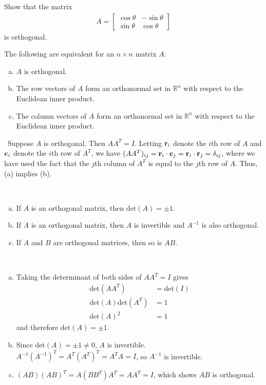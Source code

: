 \documentclass[12pt,letterpaper,reqno]{article}
\numberwithin{equation}{section}
\newcommand{\fixme}[1]{{\color{orange}{[#1]}}}
\begin{document}
\begin{exercise}
	Show that the matrix
	\begin{align*}
		A=\begin{bmatrix}
			\cos \theta & -\sin \theta \\
			\sin \theta & \cos \theta
		\end{bmatrix}
	\end{align*}
	is orthogonal.
\end{exercise}

\begin{thm}
	The following are equivalent for an $n \times n$ matrix $A$.
	\begin{enumerate}[(a)]
		\item $A$ is orthogonal.
		\item The row vectors of $A$ form an orthonormal set in $\mathbb{R}^n$ with respect to the Euclidean inner product.
		\item The column vectors of $A$ form an orthonormal set in $\mathbb{R}^n$ with respect to the Euclidean inner product.
	\end{enumerate}
\end{thm}

\begin{pf}\
	Suppose $A$ is orthogonal. Then $AA^T=I$. Letting ${\bf r}_i$ denote the $i$th row of $A$ and ${\bf c}_i$ denote the $i$th row of $A^T$, we have $(AA^T)_{ij}={\bf r}_i \cdot {\bf c}_j={\bf r}_i \cdot {\bf r}_j=\delta_{ij}$, where we have used the fact that the $j$th column of $A^T$ is equal to the $j$th row of $A$. Thus, (a) implies (b). \fixme{Finish.}
\end{pf}

\begin{thm} \
	\begin{enumerate}[(a)]
		\item If $A$ is an orthogonal matrix, then $\text{det}(A)=\pm 1$.
		\item If $A$ is an orthogonal matrix, then $A$ is invertible and $A^{-1}$ is also orthogonal.
		\item If $A$ and $B$ are orthogonal matrices, then so is $AB$.
	\end{enumerate}
\end{thm}

\begin{pf}\
	\begin{enumerate}[(a)]
		\item Taking the determinant of both sides of $AA^T=I$ gives
		\begin{align*}
			\text{det}(AA^T)&=\text{det}(I) \\
			\text{det}(A)\text{det}(A^T) &= 1 \\
			\text{det}(A)^2&=1 
		\end{align*}
		and therefore $\text{det}(A) = \pm 1$.
		\item Since $\text{det}(A)=\pm 1 \neq 0$, $A$ is invertible. $A^{-1}(A^{-1})^T=A^T(A^T)^T=A^TA=I$, so $A^{-1}$ is invertible.
		\item $(AB)(AB)^T=A(BB^T)A^T=AA^T=I$, which shows $AB$ is orthogonal.
	\end{enumerate}
\end{pf}
\end{document}
